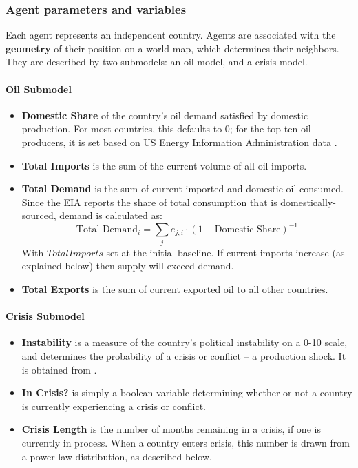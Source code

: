 \documentclass{article}
\begin{document}
\subsubsection{Agent parameters and variables}

Each agent represents an independent country. Agents are associated with the \textbf{geometry} of their position on a world map, which determines their neighbors. They are described by two submodels: an oil model, and a crisis model.

\paragraph{Oil Submodel}
\begin{itemize}
	\item \textbf{Domestic Share} of the country's oil demand satisfied by domestic production. For most countries, this defaults to 0; for the top ten oil producers, it is set based on US Energy Information Administration data \citep{}.
	\item \textbf{Total Imports} is the sum of the current volume of all oil imports. 
	\item \textbf{Total Demand} is the sum of current imported and domestic oil consumed. Since the EIA reports the share of total consumption that is domestically-sourced, demand is calculated as: $$\text{Total Demand}_i = \sum_j e_{j,i} \cdot (1 - \text{Domestic Share})^{-1}$$
	With $Total Imports$ set at the initial baseline. If current imports increase (as explained below) then supply will exceed demand. 
	\item \textbf{Total Exports} is the sum of current exported oil to all other countries.
\end{itemize}

\paragraph{Crisis Submodel}
\begin{itemize}
	\item \textbf{Instability} is a measure of the country's political instability on a 0-10 scale, and determines the probability of a crisis or conflict -- a production shock. It is obtained from \citet{eiu_2013}. 
	\item \textbf{In Crisis?} is simply a boolean variable determining whether or not a country is currently experiencing a crisis or conflict.
	\item \textbf{Crisis Length} is the number of months remaining in a crisis, if one is currently in process. When a country enters crisis, this number is drawn from a power law distribution, as described below.
\end{itemize}
\end{document}
